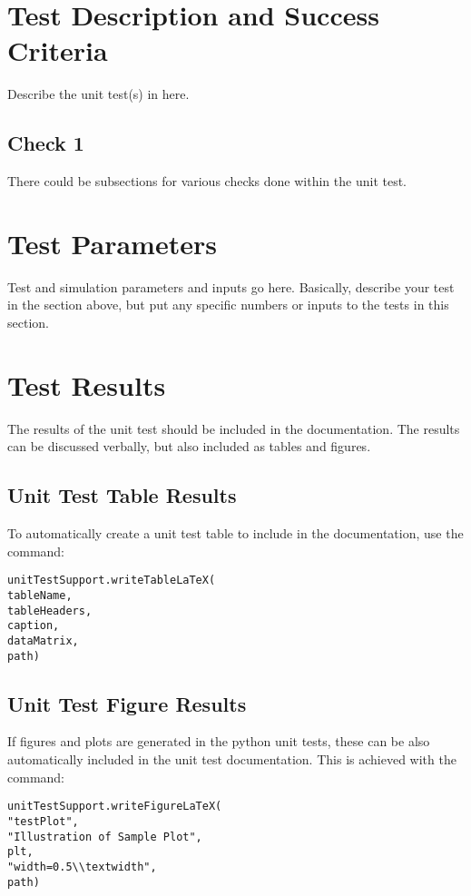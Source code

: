 
\section{Test Description and Success Criteria}
Describe the unit test(s) in here.

\subsection{Check 1}
There could be subsections for various checks done within the unit test.





\section{Test Parameters}

Test and simulation parameters and inputs go here. Basically, describe your test in the section above, but put any specific numbers or inputs to the tests in this section.






\section{Test Results}
The results of the unit test should be included in the documentation.  The results can be discussed verbally, but also included as tables and figures.  

\subsection{Unit Test Table Results}
To automatically create a unit test table to include in the documentation, use the command:
\begin{verbatim}
unitTestSupport.writeTableLaTeX(
tableName,
tableHeaders,
caption,
dataMatrix,
path)
\end{verbatim}




\subsection{Unit Test Figure Results}
If figures and plots are generated in the python unit tests, these can be also automatically included in the unit test documentation.  This is achieved with the command:
\begin{verbatim}
unitTestSupport.writeFigureLaTeX(
"testPlot",
"Illustration of Sample Plot",
plt,
"width=0.5\\textwidth",
path)
\end{verbatim}


